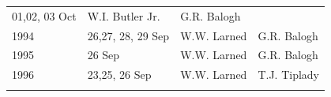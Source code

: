 \documentclass[]{article}
\begin{document}
\begin{longtable}[]{@{}llll@{}}
\begin{minipage}[t]{0.38\columnwidth}
01,02, 03 Oct\strut
\end{minipage} & \begin{minipage}[t]{0.18\columnwidth}\raggedright\strut
W.I. Butler Jr.\strut
\end{minipage} & \begin{minipage}[t]{0.20\columnwidth}\raggedright\strut
G.R. Balogh\strut
\end{minipage}\tabularnewline
\begin{minipage}[t]{0.12\columnwidth}\raggedright\strut
1994\strut
\end{minipage} & \begin{minipage}[t]{0.38\columnwidth}\raggedright\strut
26,27, 28, 29 Sep\strut
\end{minipage} & \begin{minipage}[t]{0.18\columnwidth}\raggedright\strut
W.W. Larned\strut
\end{minipage} & \begin{minipage}[t]{0.20\columnwidth}\raggedright\strut
G.R. Balogh\strut
\end{minipage}\tabularnewline
\begin{minipage}[t]{0.12\columnwidth}\raggedright\strut
1995\strut
\end{minipage} & \begin{minipage}[t]{0.38\columnwidth}\raggedright\strut
26 Sep\strut
\end{minipage} & \begin{minipage}[t]{0.18\columnwidth}\raggedright\strut
W.W. Larned\strut
\end{minipage} & \begin{minipage}[t]{0.20\columnwidth}\raggedright\strut
G.R. Balogh\strut
\end{minipage}\tabularnewline
\begin{minipage}[t]{0.12\columnwidth}\raggedright\strut
1996\strut
\end{minipage} & \begin{minipage}[t]{0.38\columnwidth}\raggedright\strut
23,25, 26 Sep\strut
\end{minipage} & \begin{minipage}[t]{0.18\columnwidth}\raggedright\strut
W.W. Larned\strut
\end{minipage} & \begin{minipage}[t]{0.20\columnwidth}\raggedright\strut
T.J. Tiplady\strut
\end{minipage}\tabularnewline
\begin{minipage}[t]{0.12\columnwidth}\raggedright\strut

\end{minipage}
\end{longtable}
\end{document}
